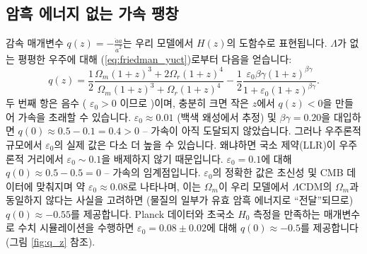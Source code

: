 \documentclass[11pt,a4paper]{article}
\begin{document}
	\subsection{암흑 에너지 없는 가속 팽창}
	
	감속 매개변수 $q(z) = -\frac{\ddot{a}a}{\dot{a}^2}$는 우리 모델에서 $H(z)$의 도함수로 표현됩니다. $\Lambda$가 없는 평평한 우주에 대해 (\ref{eq:friedman_yuct})로부터 다음을 얻습니다:
	\begin{equation}
		q(z) = \frac{1}{2}\frac{\Omega_m (1+z)^3 + 2\Omega_r (1+z)^4}{\Omega_m (1+z)^3 + \Omega_r (1+z)^4} - \frac{1}{2}\frac{\varepsilon_0 \beta\gamma (1+z)^{\beta\gamma}}{1 + \varepsilon_0 (1+z)^{\beta\gamma}}.
		\label{eq:deceleration}
	\end{equation}
	두 번째 항은 음수 ( $\varepsilon_0>0$ 이므로 )이며, 충분히 크면 작은 $z$에서 $q(z)<0$을 만들어 가속을 초래할 수 있습니다. $\varepsilon_0 \approx 0.01$ (백색 왜성에서 추정) 및 $\beta\gamma=0.20$을 대입하면 $q(0) \approx 0.5 - 0.1 = 0.4 > 0$ – 가속이 아직 도달되지 않았습니다. 그러나 우주론적 규모에서 $\varepsilon_0$의 실제 값은 다소 더 높을 수 있습니다. 왜냐하면 국소 제약(LLR)이 우주론적 거리에서 $\varepsilon_0 \sim 0.1$을 배제하지 않기 때문입니다. $\varepsilon_0 = 0.1$에 대해 $q(0) \approx 0.5 - 0.5 = 0$ – 가속의 임계점입니다. $\varepsilon_0$의 정확한 값은 초신성 및 CMB 데이터에 맞춰지며 약 $\varepsilon_0 \approx 0.08$로 나타나며, 이는 $\Omega_m$이 우리 모델에서 $\Lambda$CDM의 $\Omega_m$과 동일하지 않다는 사실을 고려하면 (물질의 일부가 유효 암흑 에너지로 ``전달''되므로) $q(0) \approx -0.55$를 제공합니다. Planck 데이터와 초국소 $H_0$ 측정을 만족하는 매개변수로 수치 시뮬레이션을 수행하면 $\varepsilon_0 = 0.08 \pm 0.02$에 대해 $q(0) \approx -0.5$를 제공합니다 (그림 \ref{fig:q_z} 참조).
	
\end{document}
